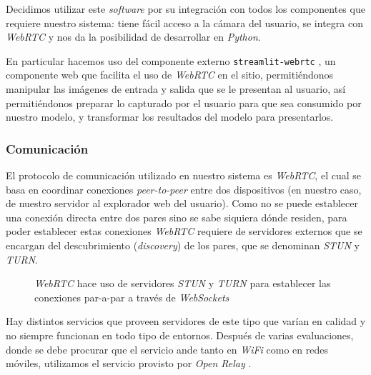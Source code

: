 \documentclass[a4paper]{article}
\begin{document}
Decidimos utilizar este \textit{software} por su integración con todos los componentes que requiere nuestro sistema: tiene fácil acceso a la cámara del usuario, se integra con \textit{WebRTC} y nos da la posibilidad de desarrollar en \textit{Python}.

En particular hacemos uso del componente externo \texttt{streamlit-webrtc} \cite{streamlit-webrtc}, un componente web que facilita el uso de \textit{WebRTC} en el sitio, permitiéndonos manipular las imágenes de entrada y salida que se le presentan al usuario, así permitiéndonos preparar lo capturado por el usuario para que sea consumido por nuestro modelo, y transformar los resultados del modelo para presentarlos.

\subsubsection{Comunicación}

El protocolo de comunicación utilizado en nuestro sistema es \textit{WebRTC}, el cual se basa en coordinar conexiones \textit{peer-to-peer} entre dos dispositivos (en nuestro caso, de nuestro servidor al explorador web del usuario). Como no se puede establecer una conexión directa entre dos pares sino se sabe siquiera dónde residen, para poder establecer estas conexiones \textit{WebRTC} requiere de servidores externos que se encargan del descubrimiento (\textit{discovery}) de los pares, que se denominan \textit{STUN} y \textit{TURN}.

\begin{figure}[H]
\caption{\textit{WebRTC} hace uso de servidores \textit{STUN} y \textit{TURN} para establecer las conexiones par-a-par a través de \textit{WebSockets}}
\end{figure}

Hay distintos servicios que proveen servidores de este tipo que varían en calidad y no siempre funcionan en todo tipo de entornos. Después de varias evaluaciones, donde se debe procurar que el servicio ande tanto en \textit{WiFi} como en redes móviles, utilizamos el servicio provisto por \textit{Open Relay} \cite{openrelay}.
\end{document}
